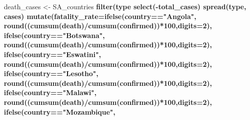 \documentclass[
]{article}
\newenvironment{Shaded}{\begin{snugshade}}{\end{snugshade}}
\newcommand{\DataTypeTok}[1]{\textcolor[rgb]{0.13,0.29,0.53}{#1}}
\newcommand{\DecValTok}[1]{\textcolor[rgb]{0.00,0.00,0.81}{#1}}
\newcommand{\KeywordTok}[1]{\textcolor[rgb]{0.13,0.29,0.53}{\textbf{#1}}}
\newcommand{\NormalTok}[1]{#1}
\newcommand{\OperatorTok}[1]{\textcolor[rgb]{0.81,0.36,0.00}{\textbf{#1}}}
\newcommand{\StringTok}[1]{\textcolor[rgb]{0.31,0.60,0.02}{#1}}
\begin{document}
\begin{Shaded}
\begin{Highlighting}[]
\NormalTok{death_cases <-}\StringTok{ }\NormalTok{SA_countries }\OperatorTok{%>%}\StringTok{ }
\StringTok{  }\KeywordTok{filter}\NormalTok{(type }\OperatorTok{%in%}\StringTok{ }\KeywordTok{c}\NormalTok{(}\StringTok{"death"}\NormalTok{, }\StringTok{"confirmed"}\NormalTok{)) }\OperatorTok{%>%}\StringTok{ }
\StringTok{  }\KeywordTok{select}\NormalTok{(}\OperatorTok{-}\NormalTok{total_cases) }\OperatorTok{%>%}\StringTok{ }
\StringTok{  }\KeywordTok{spread}\NormalTok{(type, cases) }\OperatorTok{%>%}\StringTok{ }
\StringTok{  }\KeywordTok{mutate}\NormalTok{(}\DataTypeTok{fatality_rate=}\KeywordTok{ifelse}\NormalTok{(country}\OperatorTok{==}\StringTok{"Angola"}\NormalTok{,}
                             \KeywordTok{round}\NormalTok{((}\KeywordTok{cumsum}\NormalTok{(death)}\OperatorTok{/}\KeywordTok{cumsum}\NormalTok{(confirmed))}\OperatorTok{*}\DecValTok{100}\NormalTok{,}\DataTypeTok{digits=}\DecValTok{2}\NormalTok{),}
                       \KeywordTok{ifelse}\NormalTok{(country}\OperatorTok{==}\StringTok{"Botswana"}\NormalTok{,}
                             \KeywordTok{round}\NormalTok{((}\KeywordTok{cumsum}\NormalTok{(death)}\OperatorTok{/}\KeywordTok{cumsum}\NormalTok{(confirmed))}\OperatorTok{*}\DecValTok{100}\NormalTok{,}\DataTypeTok{digits=}\DecValTok{2}\NormalTok{),}
                       \KeywordTok{ifelse}\NormalTok{(country}\OperatorTok{==}\StringTok{"Eswatini"}\NormalTok{,}
                             \KeywordTok{round}\NormalTok{((}\KeywordTok{cumsum}\NormalTok{(death)}\OperatorTok{/}\KeywordTok{cumsum}\NormalTok{(confirmed))}\OperatorTok{*}\DecValTok{100}\NormalTok{,}\DataTypeTok{digits=}\DecValTok{2}\NormalTok{),}
                       \KeywordTok{ifelse}\NormalTok{(country}\OperatorTok{==}\StringTok{"Lesotho"}\NormalTok{,}
                             \KeywordTok{round}\NormalTok{((}\KeywordTok{cumsum}\NormalTok{(death)}\OperatorTok{/}\KeywordTok{cumsum}\NormalTok{(confirmed))}\OperatorTok{*}\DecValTok{100}\NormalTok{,}\DataTypeTok{digits=}\DecValTok{2}\NormalTok{),}
                       \KeywordTok{ifelse}\NormalTok{(country}\OperatorTok{==}\StringTok{"Malawi"}\NormalTok{,}
                             \KeywordTok{round}\NormalTok{((}\KeywordTok{cumsum}\NormalTok{(death)}\OperatorTok{/}\KeywordTok{cumsum}\NormalTok{(confirmed))}\OperatorTok{*}\DecValTok{100}\NormalTok{,}\DataTypeTok{digits=}\DecValTok{2}\NormalTok{),}
                       \KeywordTok{ifelse}\NormalTok{(country}\OperatorTok{==}\StringTok{"Mozambique"}\NormalTok{,}
}}}}
\end{Highlighting}
\end{Shaded}
\end{document}
